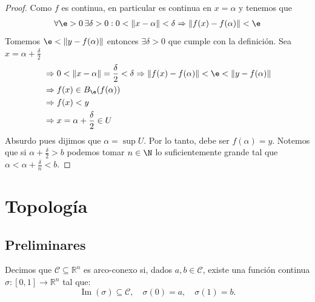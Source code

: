 \begin{theorem}
\begin{proof}
        Como \(f\) es continua, en particular es continua en \( x = \alpha \) y tenemos que\begin{align*}
            \forall \e > 0 \, \exists \delta > 0 : 0 < \| x - \alpha \| < \delta \Rightarrow \| f(x) - f(\alpha) \| < \e
        \end{align*}
        Tomemos \( \e < \|y - f(\alpha)\| \) entonces \( \exists \delta > 0 \) que cumple con la definición. Sea \( x = \alpha + \frac{\delta}{2} \)\begin{align*}
             & \Rightarrow 0 < \| x - \alpha \| = \frac{\delta}{2} < \delta \Rightarrow \| f(x) - f(\alpha) \| < \e < \| y - f(\alpha) \| \\
             & \Rightarrow f(x) \in B_{\e}(f(\alpha))                                                                                     \\
             & \Rightarrow f(x) < y                                                                                                       \\
             & \Rightarrow x = \alpha + \frac{\delta}{2} \in U                                                                            \\
        \end{align*}
        Absurdo pues dijimos que \( \alpha = \sup U \). Por lo tanto, debe ser \( f(\alpha) = y \).
        Notemos que si \( \alpha + \frac{\delta}{2} > b \) podemos tomar \( n \in \N \) lo suficientemente grande tal que \( \alpha < \alpha + \frac{\delta}{n} < b \).
    \end{proof}
\end{theorem}

\newpage

\section{Topología}
\subsection{Preliminares}

\begin{definition}
    Decimos que \(\mathcal{C} \subseteq \mathbb{R}^n\) es arco-conexo si, dados \(a, b \in \mathcal{C}\), existe una función continua \(\sigma : [0, 1] \to \mathbb{R}^n\) tal que:
    \[
        \operatorname{Im}(\sigma) \subseteq \mathcal{C}, \quad \sigma(0) = a, \quad \sigma(1) = b.
    \]
\end{definition}

